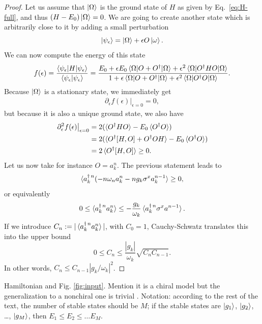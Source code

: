 \documentclass[notitlepage, prx, preprint, amsmath,superscriptaddress,amssymb]{revtex4-1}
\begin{document}
\begin{proof}
Let us assume that $\ket{\Omega}$ is the ground state of $H$ as given by Eq.\ \eqref{eq:H-full}, and thus $(H-E_0)\ket{\Omega} = 0$. We are going to create another state which is arbitrarily close to it by adding a small perturbation
\begin{equation}
\ket{\psi_\epsilon} = \ket{\Omega} + \epsilon O \ket{\omega}.
\end{equation}
We can now compute the energy of this state
\begin{equation}
f(\epsilon) = \frac{\braket{\psi_\epsilon|H|\psi_\epsilon}}{\braket{\psi_\epsilon|\psi_\epsilon}} = \frac{E_0+\epsilon E_0 \braket{\Omega| O + O^\dagger |\Omega} + \epsilon^2\braket{\Omega|O^\dagger H O|\Omega}}{1+\epsilon \braket{\Omega|O+O^\dagger|\Omega} + \epsilon^2\braket{\Omega|O^\dagger O|\Omega}}.
\end{equation}
Because $\ket{\Omega}$ is a stationary state, we immediately get
\begin{align}
\left.\partial_\epsilon f(\epsilon)\right|_{\epsilon=0} = 0,
\end{align}
but because it is also a unique ground state, we also have
\begin{align}
\left.\partial^2_\epsilon f(\epsilon)\right|_{\epsilon=0} &= 2(\braket{O^\dagger H O}-E_0\braket{O^\dagger O}) \\
&= 2(\braket{O^\dagger [H,O]+O^\dagger O H}-E_0\braket{O^\dagger O}) \nonumber\\
&= 2\braket{O^\dagger [H,O]}\geq 0.\nonumber
\end{align}
Let us now take for instance $O=a_k^n$. The previous statement leads to
\begin{align}
\braket{a_k^{\dagger\,n} (-n\omega_n a_k^{n} -n g_k \sigma^x a_k^{n-1}}\geq 0,
\end{align}
or equivalently
\begin{equation}
0 \leq \braket{a_k^{\dagger\,n}a_k^n} \leq -\frac{g_k}{\omega_k}\braket{a_k^{\dagger\,n}\sigma^x a^{n-1}}.
\end{equation}
If we introduce $C_n := |\braket{a_k^{\dagger\,n}a_k^n}|$, with $C_0=1$, Cauchy-Schwatz translates this into the upper bound
\begin{equation}
0\leq C_n \leq \frac{|g_k|}{\omega_k} \sqrt{C_n C_{n-1}}.
\end{equation}
In other words, $C_n \leq C_{n-1}|g_k/\omega_k|^2$.
\end{proof}


{\color{blue}Hamiltonian and Fig. \ref{fig:input}. Mention it is a chiral model but the generalization to a nonchiral one is trivial \cite{Fan2010}. Notation: according to the rest of the text, the number of stable states should be $M$; if the stable states are $\ket{g_1}$, $\ket{g_2}$, \dots, $\ket{g_M}$, then $E_1\leq E_2\leq \dots E_M$.}
\end{document}
